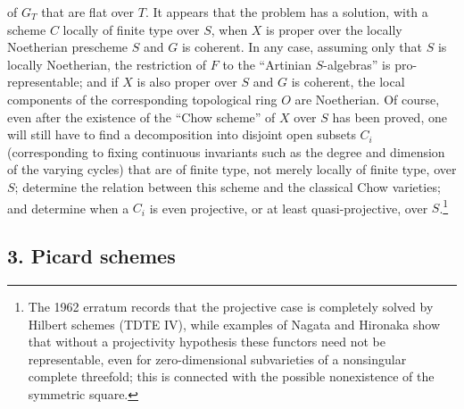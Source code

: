 of $G_T$ that are flat over $T$. It appears that the problem has a solution,
with a scheme $C$ locally of finite type over $S$, when $X$ is proper over the
locally Noetherian prescheme $S$ and $G$ is coherent. In any case, assuming
only that $S$ is locally Noetherian, the restriction of $F$ to the “Artinian
$S$-algebras” is pro-representable; and if $X$ is also proper over $S$ and $G$
is coherent, the local components of the corresponding topological ring $O$
are Noetherian. Of course, even after the existence of the “Chow scheme” of
$X$ over $S$ has been proved, one will still have to find a decomposition into
disjoint open subsets $C_i$ (corresponding to fixing continuous invariants such
as the degree and dimension of the varying cycles) that are of finite type,
not merely locally of finite type, over $S$; determine the relation between
this scheme and the classical Chow varieties; and determine when a $C_i$ is
even projective, or at least quasi-projective, over $S$.\footnote{The 1962
erratum records that the projective case is completely solved by Hilbert
schemes (TDTE IV), while examples of Nagata and Hironaka show that without a
projectivity hypothesis these functors need not be representable, even for
zero-dimensional subvarieties of a nonsingular complete threefold; this is
connected with the possible nonexistence of the symmetric square.}

\subsection*{3. Picard schemes}

